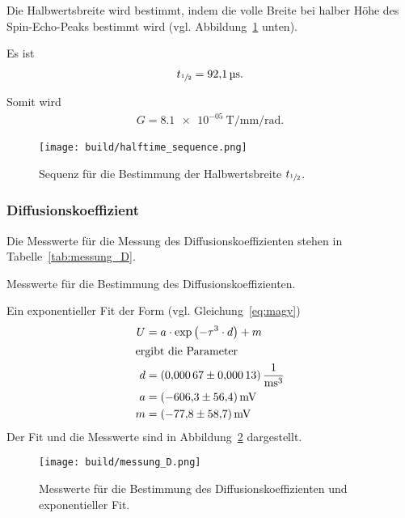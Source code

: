 Die Halbwertsbreite wird bestimmt, indem die volle Breite bei halber Höhe des Spin-Echo-Peaks bestimmt wird (vgl. Abbildung~\ref{fig:halftime_sequence} unten).

Es ist
\begin{align}%
  \label{eq:t_1/2}
  t_{\sfrac{1}{2}} = \SI{92.1}{\micro\second}.
\end{align}

Somit wird
\begin{align}%
  \label{eq:g}
  G = \SI[]{8.1e-05}{\tesla\per\milli\meter\per\radian}.
\end{align}



\begin{figure}[ht]
  \centering
  \texttt{[image: build/halftime\_sequence.png]}
  \caption{Sequenz für die Bestimmung der Halbwertsbreite $t_{\sfrac{1}{2}}$.}%
  \label{fig:halftime_sequence}
\end{figure}


\subsubsection{Diffusionskoeffizient}%
\label{sub:diffusionskoeefizient}
Die Messwerte für die Messung des Diffusionskoeffizienten stehen in Tabelle~\ref{tab:messung_D}.

\begin{table}[ht]
  \centering
  \caption{Messwerte für die Bestimmung des Diffusionskoeffizienten.}%
  \label{tab:messung_D}
  
\end{table}

Ein exponentieller Fit der Form (vgl. Gleichung~\eqref{eq:magy})
\begin{align*}
  U &= a \cdot \exp{\left(- \tau^3 \cdot d\right)} + m \\
  \intertext{ergibt die Parameter}
  d &= \SI{0.00067 \pm 0.00013}{\per\milli\second\tothe3} \\
  a &= \SI{-606.3 \pm 56.4}{\milli\volt} \\
  m &= \SI{-77.8 \pm 58.7}{\milli\volt}
\end{align*}
Der Fit und die Messwerte sind in Abbildung~\ref{fig:messung_D} dargestellt.

\begin{figure}[ht]
  \centering
  \texttt{[image: build/messung\_D.png]}
  \caption{Messwerte für die Bestimmung des Diffusionskoeffizienten und exponentieller Fit.}%
  \label{fig:messung_D}
\end{figure}

